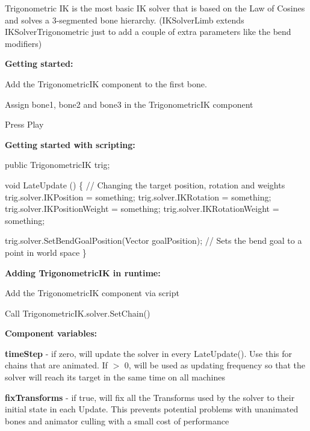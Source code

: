 Trigonometric IK is the most basic IK solver that is based on the Law of Cosines and solves a 3-\/segmented bone hierarchy. (I\+K\+Solver\+Limb extends I\+K\+Solver\+Trigonometric just to add a couple of extra parameters like the bend modifiers)

{\bfseries Getting started\+:}
\begin{DoxyItemize}
\item Add the Trigonometric\+IK component to the first bone.
\item Assign bone1, bone2 and bone3 in the Trigonometric\+IK component
\item Press Play
\end{DoxyItemize}

{\bfseries Getting started with scripting\+:}


\begin{DoxyCode}
\textcolor{keyword}{public} TrigonometricIK trig;

\textcolor{keywordtype}{void} LateUpdate () \{
    \textcolor{comment}{// Changing the target position, rotation and weights}
    trig.solver.IKPosition = something;
    trig.solver.IKRotation = something;
    trig.solver.IKPositionWeight = something;
    trig.solver.IKRotationWeight = something;

    trig.solver.SetBendGoalPosition(Vector goalPosition); \textcolor{comment}{// Sets the bend goal to a point in world space }
\}
\end{DoxyCode}


{\bfseries Adding Trigonometric\+IK in runtime\+:}
\begin{DoxyItemize}
\item Add the Trigonometric\+IK component via script
\item Call Trigonometric\+I\+K.\+solver.\+Set\+Chain()
\end{DoxyItemize}



{\bfseries Component variables\+:}
\begin{DoxyItemize}
\item {\bfseries time\+Step} -\/ if zero, will update the solver in every Late\+Update(). Use this for chains that are animated. If $>$ 0, will be used as updating frequency so that the solver will reach its target in the same time on all machines
\item {\bfseries fix\+Transforms} -\/ if true, will fix all the Transforms used by the solver to their initial state in each Update. This prevents potential problems with unanimated bones and animator culling with a small cost of performance
\end{DoxyItemize}

